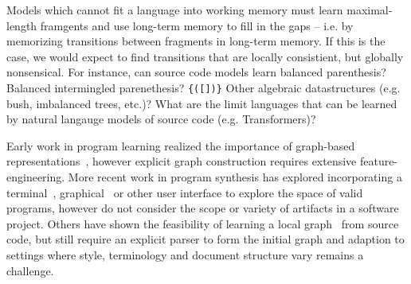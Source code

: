\documentclass[sigconf]{acmart}
\begin{document}
Models which cannot fit a language into working memory must learn maximal-length framgents and use long-term memory to fill in the gaps -- i.e. by memorizing transitions between fragments in long-term memory. If this is the case, we would expect to find transitions that are locally consistient, but globally nonsensical. For instance, can source code models learn balanced parenthesis? Balanced intermingled parenethesis? \texttt{\{([])\}} Other algebraic datastructures (e.g. bush, imbalanced trees, etc.)? What are the limit languages that can be learned by natural langauge models of source code (e.g. Transformers)?



Early work in program learning realized the importance of graph-based representations~\citep{allamanis2017learning}, however explicit graph construction requires extensive feature-engineering. More recent work in program synthesis has explored incorporating a terminal~\citep{ellis2019write}, graphical~\citep{walke2020learning} or other user interface to explore the space of valid programs, however do not consider the scope or variety of artifacts in a software project. Others have shown the feasibility of learning a local graph~\citep{johnson2020learning} from source code, but still require an explicit parser to form the initial graph and adaption to settings where style, terminology and document structure vary remains a challenge.
\end{document}
